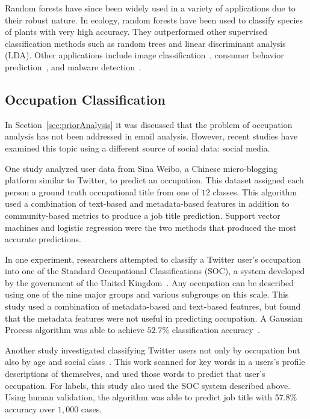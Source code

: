 \documentclass[12pt]{report}
\begin{document}
Random forests have since been widely used in a variety of applications due to their robust nature.
In ecology, random forests have been used to classify species of plants with very high accuracy.
They outperformed other supervised classification methods such as random trees and linear discriminant analysis (LDA)\cite{cutler2007random}.
Other applications include image classification~\cite{marin2013random}, consumer behavior prediction~\cite{lariviere2005predicting}, and malware detection~\cite{sami2010malware}. 

\subsection{Occupation Classification}
In Section~\ref{sec:priorAnalysis} it was discussed that the problem of occupation analysis has not been addressed in email analysis.
However, recent studies have examined this topic using a different source of social data: social media.

One study analyzed user data from Sina Weibo, a Chinese  micro-blogging platform similar to Twitter, to predict an occupation\cite{huang2015multi}.
This dataset assigned each person a ground truth occupational title from one of $12$ classes.
This algorithm used a combination of text-based and metadata-based features in addition to community-based metrics to produce a job title prediction.
Support vector machines and logistic regression were the two methods that produced the most accurate predictions.  

In one experiment, researchers attempted to classify a Twitter user's occupation into one of the Standard Occupational Classifications (SOC), a system developed by the government of the United Kingdom~\cite{SOC}.
Any occupation can be described using one of the nine major groups and various subgroups on this scale.
This study used a combination of metadata-based and text-based features, but found that the metadata features were not useful in predicting occupation.
A Gaussian Process algorithm was able to achieve $52.7\%$ classification accuracy~\cite{preoctiuc2015analysis}.

Another study investigated classifying Twitter users not only by occupation but also by age and social class~\cite{sloan2015tweets}.
This work scanned for key words in a users's profile descriptions of themselves, and used those words to predict that user's occupation. 
For labels, this study also used the SOC system described above.
Using human validation, the algorithm was able to predict job title with 57.8\% accuracy over $1,000$ cases.
\end{document}

